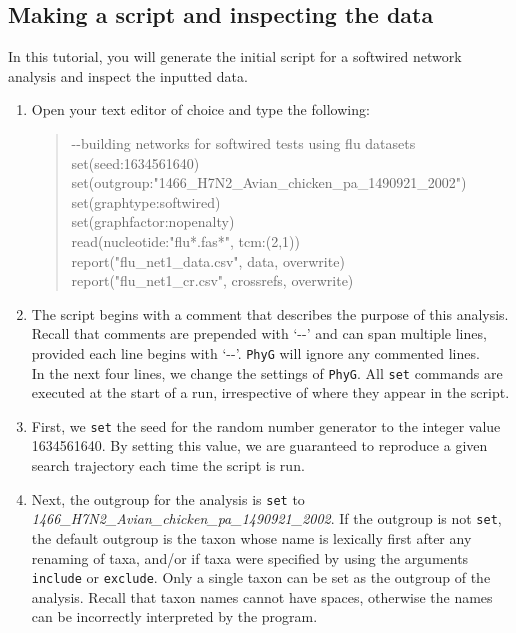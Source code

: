 \documentclass[11pt]{article}
\newcommand{\phyg}{\texttt{PhyG} }
\begin{document}
\subsection{Making a script and inspecting the data}
\label{subsec:networkscript}

In this tutorial, you will generate the initial script for a softwired network analysis 
and inspect the inputted data.

\begin{enumerate}

\item Open your text editor of choice and type the following:

	\begin{quote}	
	-\/-building networks for softwired tests using flu datasets\\
	set(seed:1634561640)\\
	set(outgroup:"1466\_H7N2\_Avian\_chicken\_pa\_1490921\_2002")\\
	set(graphtype:softwired)\\
	set(graphfactor:nopenalty)\\ 
	read(nucleotide:"flu*.fas*", tcm:(2,1))\\
	report("flu\_net1\_data.csv", data, overwrite)\\
	report("flu\_net1\_cr.csv", crossrefs, overwrite)
	\end{quote}

\item The script begins with a comment that describes the purpose of this 
analysis. Recall that comments are prepended with `-{}-' and can span multiple 
lines, provided each line begins with `-{}-'. \phyg will ignore any commented lines.\\

In the next four lines, we change the settings of \texttt{PhyG}. All \texttt{set}
commands are executed at the start of a run, irrespective of where they appear 
in the script. 

\item First, we \texttt{set} the seed for the random number generator to the 
integer value 1634561640. By setting this value, we are guaranteed to reproduce 
a given search trajectory each time the script is run.

\item Next, the outgroup for the analysis is \texttt{set} to 
\emph{1466\_H7N2\_Avian\_chicken\_pa\_1490921\_2002}. If the outgroup is not 
\texttt{set}, the default outgroup is the taxon whose name is lexically first after any 
renaming of taxa, and/or if taxa were specified by using the arguments \texttt{include}
or \texttt{exclude}. Only a single taxon can be set as the outgroup of the analysis. 
Recall that taxon names cannot have spaces, otherwise the names can be incorrectly 
interpreted by the program.


\end{enumerate}
\end{document}
